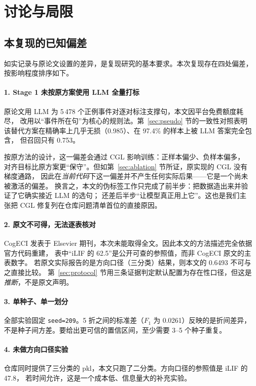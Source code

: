 \section{讨论与局限}
\label{sec:discussion}

\subsection{本复现的已知偏差}

如实记录与原论文设置的差异，是复现研究的基本要求。本次复现存在四处偏差，
按影响程度排序如下。

\paragraph{1. Stage 1 未按原方案使用 LLM 全量打标}
原论文用 LLM 为 5\,478 个正例事件对逐对标注支撑句，本文因平台免费额度耗尽，
改用以“事件所在句”为核心的规则法。第~\ref{sec:pseudo} 节的一致性对照表明
该替代方案在精确率上几乎无损（0.985）、在 97.4\% 的样本上被 LLM 答案完全包含，
但召回只有 0.753。

按原方法的设计，这一偏差会通过 CGL 影响训练：正样本偏少、负样本偏多，
对齐目标比原方案更“保守”。但如第~\ref{sec:ablation} 节所证，原实现的 CGL 没有梯度通路，
因此在\emph{当前代码}下这一偏差并不产生任何实际后果——它是一个尚未被激活的偏差。
换言之，本文的伪标签工作只完成了前半步：把数据造出来并验证了它确实接近 LLM 的选句；
还差后半步“让模型真正用上它”。这也是我们主张把 CGL 修复列在仓库问题清单首位的直接原因。

\paragraph{2. 原文不可得，无法逐表核对}
CogECI 发表于 Elsevier 期刊，本次未能取得全文。因此本文的方法描述完全依据官方代码重建，
表中“iLIF 的 62.5”是公开可查的参照值，而非 CogECI 原文的主表数字。
若原文实际报告的是方向口径（三分类）结果，则本文的 0.6493 不可与之直接比较。
第~\ref{sec:protocol} 节用三条证据判定默认配置为存在性口径，但这是\emph{推断}，不是原文声明。

\paragraph{3. 单种子、单一划分}
全部实验固定 \texttt{seed=209}。5 折之间的标准差（$F_1$ 为 0.0261）反映的是折间差异，
不是种子间方差。要给出更可信的置信区间，至少需要 3--5 个种子重复。

\paragraph{4. 未做方向口径实验}
仓库同时提供了三分类的 pkl，本文只跑了二分类。方向口径的参照值是 iLIF 的 47.8，
若时间允许，这是一个成本低、信息量大的补充实验。

